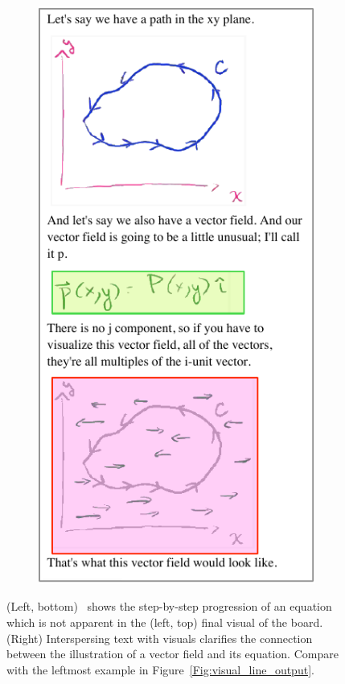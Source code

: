 \begin{figure}[t!]
\begin{subfigure}[t]{2.4in}
    \end{subfigure}%
~
       \begin{subfigure}[t]{1.8in}
        \centering
        \includegraphics[width=\textwidth]{figures/intersperse_highlight.pdf}
    \end{subfigure}
    \caption{(Left, bottom) \systemname\ shows the step-by-step progression of an equation  which is not apparent in the (left, top) final visual of the board. (Right) Interspersing text with visuals clarifies the connection between the illustration of a vector field and its equation. Compare with the leftmost example in Figure~\ref{Fig:visual_line_output}.}
    \label{Fig:feature_highlight}
\end{figure} 


